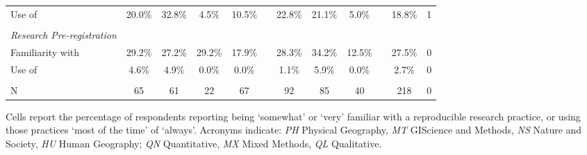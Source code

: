 \documentclass[]{interact}
\theoremstyle{plain}%
\theoremstyle{definition}
\theoremstyle{remark}
\begin{document}
\begin{landscape}
\begin{table}[h]
\begin{threeparttable}
\begin{tabular}{l c c c c c c c c c c c}
         Use of                             & 20.0\% & 32.8\% & 4.5\% & 10.5\% & & 22.8\% & 21.1\% & 5.0\% & & 18.8\% & 1 \\
                                            & & & & & & & & & & & \\
         \textit{Research Pre-registration}     & & & & & & & & & & & \\
         Familiarity with                   & 29.2\% & 27.2\% & 29.2\% & 17.9\% & & 28.3\% & 34.2\% & 12.5\% &  & 27.5\% & 0\\
         Use of                             & 4.6\% & 4.9\% & 0.0\% & 0.0\% & & 1.1\% & 5.9\% & 0.0\% &  & 2.7\% & 0 \\
                                            & & & & & & & & & & & \\
         N                                  & 65 & 61 & 22 & 67 & & 92 & 85 & 40 & & 218 & 0 \\
        \hline
    \end{tabular}
    \begin{tablenotes}
        \footnotesize
        \item Cells report the percentage of respondents reporting being `somewhat' or `very' familiar with a reproducible research practice, or using those practices `most of the time' of `always'. Acronyms indicate: \textit{PH} Physical Geography, \textit{MT} GIScience and Methods, \textit{NS} Nature and Society, \textit{HU} Human Geography; \textit{QN} Quantitative, \textit{MX} Mixed Methods, \textit{QL} Qualitative. 
    \end{tablenotes}
    \label{tab:familar-use}
    \end{threeparttable}
\end{table}
\end{landscape}
\end{document}

